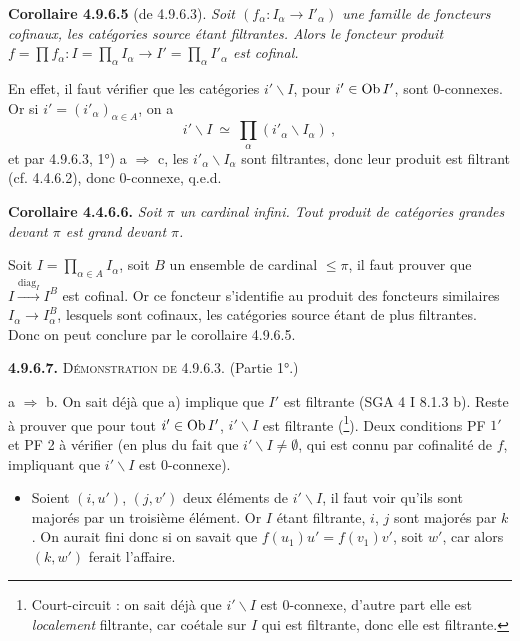 \textbf{Corollaire 4.9.6.5} (de 4.9.6.3). \textit{Soit $(f_\alpha : I_\alpha \longrightarrow I'_\alpha)$ une famille de foncteurs cofinaux, les catégories source étant filtrantes. Alors le foncteur produit $f = \prod f_\alpha : I = \prod_\alpha I_\alpha \longrightarrow I' = \prod_\alpha I'_\alpha$ est cofinal.}

En effet, il faut vérifier que les catégories $i'\backslash I$, pour $i' \in \operatorname{Ob} I'$, sont 0-connexes. Or si $i' = (i'_\alpha)_{\alpha \in A}$, on a
\[
i'\backslash I \ \simeq \ \prod_\alpha (i'_\alpha\backslash I_\alpha) \ ,
\]
et par 4.9.6.3, 1°) a $\Longrightarrow$ c, les $i'_\alpha\backslash I_\alpha$ sont filtrantes, donc leur produit est filtrant
(cf. 4.4.6.2), donc 0-connexe, q.e.d. %

\textbf{Corollaire 4.4.6.6.} \textit{Soit $\pi$ un cardinal infini. Tout produit de catégories grandes devant $\pi$ est grand devant $\pi$.} %

Soit $I = \prod_{\alpha \in A} I_\alpha$, soit $B$ un ensemble de cardinal $\leqslant \pi$, il faut prouver que $I \xrightarrow{\mathrm{diag}_I} I^B$ est cofinal. Or ce foncteur s'identifie au produit des foncteurs similaires $I_\alpha \longrightarrow I_\alpha^B$, lesquels sont cofinaux, les catégories source étant de plus filtrantes. Donc on peut conclure par le corollaire 4.9.6.5.

\textbf{4.9.6.7.} \textsc{Démonstration de} 4.9.6.3. (Partie 1°.)

a $\Longrightarrow$ b. On sait déjà que a) implique que $I'$ est filtrante (SGA 4 I 8.1.3 b). Reste à prouver que pour tout $i' \in \operatorname{Ob} I'$, $i'\backslash I$ est filtrante (\footnote[103]{Court-circuit : on sait déjà que $i'\backslash I$ est 0-connexe, d'autre part elle est \textit{localement} filtrante, car coétale sur $I$ qui est filtrante, donc elle est filtrante.}). Deux conditions PF $1'$ et PF 2 à vérifier (en plus du fait que $i'\backslash I \neq \emptyset$, qui est connu par cofinalité de $f$, impliquant que $i'\backslash I$ est 0-connexe).
\begin{itemize}[label={}]
\item[1)] Soient $(i,u')$, $(j,v')$ deux éléments de $i'\backslash I$, il faut voir qu'ils sont majorés par un troisième élément. Or $I$ étant filtrante, $i$, $j$ sont majorés par $k$. On aurait fini donc si on savait que $f(u_1)u' = f(v_1)v'$, soit $w'$, car alors $(k,w')$ ferait l'affaire.
\end{itemize}

